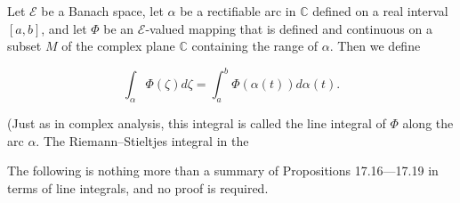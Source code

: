 Let $\mathcal{E}$ be a Banach space, let $\alpha$ be a rectifiable arc in $\mathbb{C}$ defined on a real interval $[a, b]$, and let $\Phi$ be an $\mathcal{E}$-valued mapping that is defined and continuous on a subset $M$ of the complex plane $\mathbb{C}$ containing the range of $\alpha$. Then we define

$$\int_\alpha \Phi(\zeta) d\zeta = \int_a^b \Phi(\alpha(t)) d\alpha(t).$$

(Just as in complex analysis, this integral is called the line integral of $\Phi$ along the arc $\alpha$. The Riemann–Stieltjes integral in the

The following is nothing more than a summary of Propositions 17.16—17.19 in terms of line integrals, and no proof is required.

